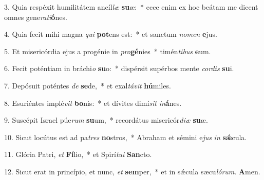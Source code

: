 \item 3. Quia respéxit humilitátem ancíl\textit{læ} \textbf{su}æ:~* ecce enim ex hoc beátam me dicent omnes gene\textit{rati}\textbf{ó}nes.
\item 4. Quia fecit mihi magna \textit{qui} \textbf{pot}ens est:~* et san\-ctum \textit{nomen} \textbf{e}jus.
\item 5. Et misericórdia ejus a progénie in \textit{pro}\textbf{gé}nies~* timén\textit{tibus} \textbf{e}um.
\item 6. Fecit poténtiam in bráchi\textit{o} \textbf{su}o:~* dispérsit supérbos mente \textit{cordis} \textbf{su}i.
\item 7. Depósuit poténtes \textit{de} \textbf{se}de,~* et exal\textit{távit} \textbf{hú}miles.
\item 8. Esuriéntes implé\textit{vit} \textbf{bo}nis:~* et dívites dimí\textit{sit} \textit{in}\textbf{á}nes.
\item 9. Suscépit Israel púe\textit{rum} \textbf{su}um,~* recordátus misericór\textit{diæ} \textbf{su}æ.
\item 10. Sicut locútus est ad pa\textit{tres} \textbf{no}stros,~* Abraham et sémini e\textit{jus} \textit{in} \textbf{sǽ}cula.
\item 11. Glória Patri, \textit{et} \textbf{Fí}lio,~* et Spirí\textit{tu}\textit{i} \textbf{San}cto.
\item 12. Sicut erat in princípio, et nunc, \textit{et} \textbf{sem}per,~* et in sǽcula sæcu\hspace{0.03em}\textit{ló}\textit{rum}. \textbf{A}men.
